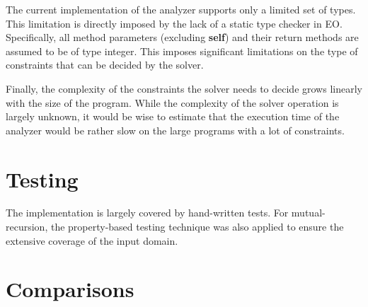 The current implementation of the analyzer supports only a limited set of types. This limitation is directly imposed by the lack of a static type checker in EO. Specifically, all method parameters (excluding \textbf{self}) and their return methods are assumed to be of type integer. This imposes significant limitations on the type of constraints that can be decided by the solver.

Finally, the complexity of the constraints the solver needs to decide grows linearly with the size of the program. While the complexity of the solver operation is largely unknown, it would be wise to estimate that the execution time of the analyzer would be rather slow on the large programs with a lot of constraints.

\section{Testing}
\label{eval:testing}
The implementation is largely covered by hand-written tests. For mutual-recursion, the property-based testing technique \cite{property_based_testing} was also applied to ensure the extensive coverage of the input domain.

\section{Comparisons}
\label{eval:comparisons}
